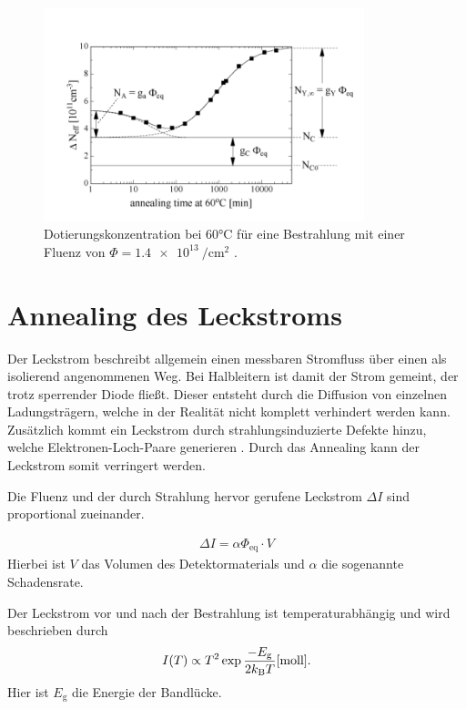 \begin{figure}
  \includegraphics[width=0.83\textwidth]{logos/n_eff_beispiel.PNG}
  \caption{Dotierungskonzentration bei 60°C für eine Bestrahlung mit einer Fluenz
  von $\Phi=\SI{1.4e13}{\per\centi\meter\squared}$ .\cite{moll}}
  \label{fig:n_eff_beispiel}
\end{figure}



\section{Annealing des Leckstroms}
Der Leckstrom beschreibt allgemein einen messbaren Stromfluss über einen als isolierend
angenommenen Weg. Bei Halbleitern ist damit der Strom gemeint, der trotz sperrender
Diode fließt. Dieser entsteht durch die Diffusion von einzelnen Ladungsträgern, welche
in der Realität nicht komplett verhindert werden kann.
Zusätzlich kommt ein Leckstrom durch strahlungsinduzierte Defekte hinzu, welche
Elektronen-Loch-Paare generieren \cite{moll}.
Durch das Annealing kann der Leckstrom somit verringert werden.

Die Fluenz und der durch Strahlung hervor gerufene Leckstrom $\Delta I$ sind
proportional zueinander.


\begin{align}
  \Delta I = \alpha \Phi_{\mathrm{eq}} \cdot V
\end{align}
Hierbei ist $V$ das Volumen des Detektormaterials und $\alpha$ die
sogenannte Schadensrate.

Der Leckstrom vor und nach der Bestrahlung ist temperaturabhängig und wird
beschrieben durch
\begin{align}
  I(T) \propto T^2 \exp{\frac{-E_{\mathrm{g}}}{2 k_{\mathrm{B}}T}} \text{\cite{moll}} \label{eqn:Chilingarov_2013}.
\end{align}
Hier ist $E_{\mathrm{g}}$ die Energie der Bandlücke.


